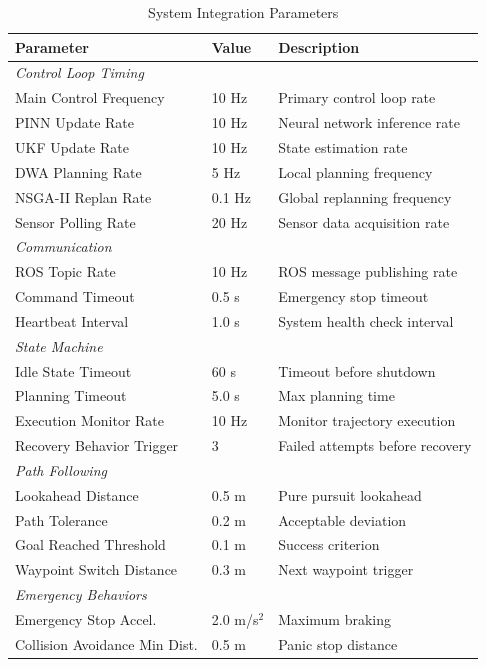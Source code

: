\begin{table}[htbp]
\centering
\caption{System Integration Parameters}
\label{tab:integration_params}
\begin{tabular}{@{}lll@{}}
\toprule
\textbf{Parameter} & \textbf{Value} & \textbf{Description} \\
\midrule
\multicolumn{3}{l}{\textit{Control Loop Timing}} \\
Main Control Frequency & 10 Hz & Primary control loop rate \\
PINN Update Rate & 10 Hz & Neural network inference rate \\
UKF Update Rate & 10 Hz & State estimation rate \\
DWA Planning Rate & 5 Hz & Local planning frequency \\
NSGA-II Replan Rate & 0.1 Hz & Global replanning frequency \\
Sensor Polling Rate & 20 Hz & Sensor data acquisition rate \\
\midrule
\multicolumn{3}{l}{\textit{Communication}} \\
ROS Topic Rate & 10 Hz & ROS message publishing rate \\
Command Timeout & 0.5 s & Emergency stop timeout \\
Heartbeat Interval & 1.0 s & System health check interval \\
\midrule
\multicolumn{3}{l}{\textit{State Machine}} \\
Idle State Timeout & 60 s & Timeout before shutdown \\
Planning Timeout & 5.0 s & Max planning time \\
Execution Monitor Rate & 10 Hz & Monitor trajectory execution \\
Recovery Behavior Trigger & 3 & Failed attempts before recovery \\
\midrule
\multicolumn{3}{l}{\textit{Path Following}} \\
Lookahead Distance & 0.5 m & Pure pursuit lookahead \\
Path Tolerance & 0.2 m & Acceptable deviation \\
Goal Reached Threshold & 0.1 m & Success criterion \\
Waypoint Switch Distance & 0.3 m & Next waypoint trigger \\
\midrule
\multicolumn{3}{l}{\textit{Emergency Behaviors}} \\
Emergency Stop Accel. & 2.0 m/s$^2$ & Maximum braking \\
Collision Avoidance Min Dist. & 0.5 m & Panic stop distance \\

\end{tabular}
\end{table}
